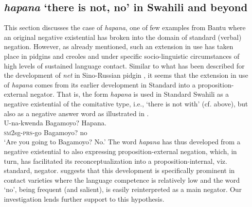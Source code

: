 \documentclass[output=paper]{langscibook}
\begin{document}
\subsection{\textit{hapana} `there is not, no' in Swahili and beyond}\label{sec:1:6.4}
%
This section discusses the case of \textit{hapana}, one of few examples
from Bantu where an original negative existential has broken into the
domain of standard (verbal) negation. However, as already mentioned, such
an extension in use has taken place in pidgins and creoles and under
specific socio-linguistic circumstances of high levels of sustained
language contact. Similar to what has been described for the development of
 \textit{net} in Sino-Russian pidgin
\parencites{Veselinova2013}{Veselinova2016}, it seems that the extension in use
of \textit{hapana} comes from its earlier development in Standard
  into a pro\-po\-si\-tion-ex\-ter\-nal negator. That is, the form \textit{hapana} is used in Standard Swahili as a negative existential of the comitative type, i.e., `there is not with' (cf.  above), but also as a negative answer word as illustrated in .
%
\ea\label{ex:swahili-bagamoyo}
\\
\gll U-na-kwenda Bagamoyo? Hapana.\\
	\textsc{sm}2sg-\textsc{prs}-go Bagamoyo? no\\
\glt 	`Are you going to Bagamoyo? No.'
\z
%
The word \textit{hapana} has thus developed from a negative existential to
also expressing proposition-external negation, which, in turn, has
facilitated its reconceptualization into a proposition-internal, viz.
standard, negator. \textcites{Veselinova2013}{Veselinova2016} suggests that this
development is specifically prominent in contact varieties where the
language competence is relatively low and the word `no', being frequent
(and salient), is easily reinterpreted as a main negator. Our investigation
lends further support to this hypothesis.
\end{document}
